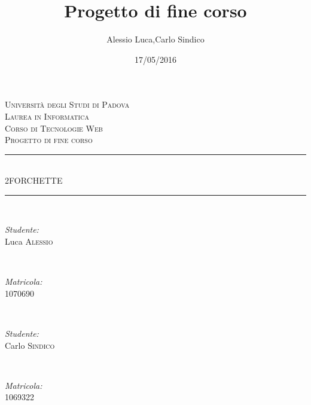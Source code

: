 \documentclass[12pt]{article}
\title{Progetto di fine corso}
\date{17/05/2016}
\author{Alessio Luca,Carlo Sindico}
\begin{document}
	
	\begin{titlepage}
		\newcommand{\HRule}{\rule{\linewidth}{0.5mm}}%
		\center
		
		\textsc{\LARGE Universit\`a degli Studi di Padova}\\[1.5cm] 
		\textsc{\Large Laurea in Informatica}\\[0.5cm]
		\textsc{\large Corso di Tecnologie Web}\\[0.5cm]
		\textsc{\large Progetto di fine corso}\\[0.5cm]
		
		
		\HRule \\[0.4cm]
		{ \huge  2FORCHETTE}\\[0.3cm] 
		\HRule \\[0.4cm]
		
		
		
		\begin{minipage}{0.3\textwidth}
			\begin{flushleft} \large
				\emph{Studente:}\\
				Luca \textsc{Alessio} %
			\end{flushleft}
		\end{minipage}
		~
		\begin{minipage}{0.3\textwidth}
			\begin{flushright} \large
				\emph{Matricola:} \\
				\textsc{1070690} %
			\end{flushright}
		\end{minipage}\\[2cm]
		
			\begin{minipage}{0.3\textwidth}
				\begin{flushleft} \large
					\emph{Studente:}\\
					Carlo \textsc{Sindico} %
				\end{flushleft}
			\end{minipage}
			~
			\begin{minipage}{0.3\textwidth}
				\begin{flushright} \large
					\emph{Matricola:} \\
					\textsc{1069322} %
				\end{flushright}
			\end{minipage}\\[2cm]
			

\end{titlepage}
\end{document}
